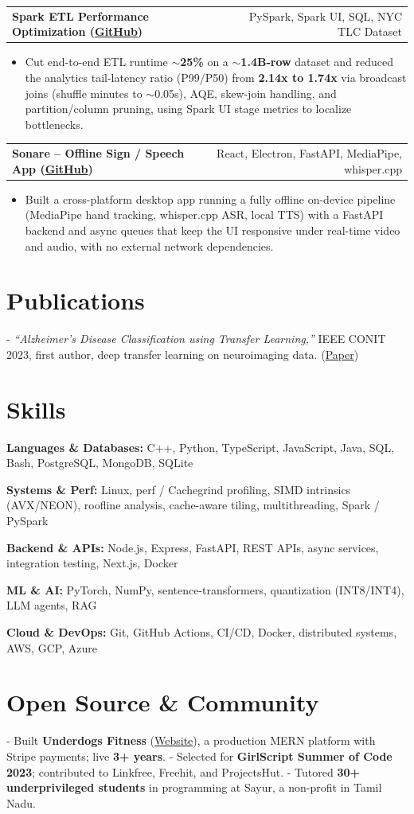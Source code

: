 \documentclass[letterpaper,11pt]{article}
\makeatletter
\newcommand{\projItem}[2]{%
  \vspace{2pt}
  \begin{tabular*}{\textwidth}{@{}l@{\extracolsep{\fill}}r@{}}
    \textbf{#1} & #2 \\
  \end{tabular*}\par\vspace{-3pt}
}
\newcommand{\skillLine}[2]{\textbf{#1:} #2\par\vspace{1.5pt}}
\newcommand{\inlineBlock}[1]{{\setlength{\leftskip}{0.18in}\small #1\par}}
\makeatother
\begin{document}
\projItem{Spark ETL Performance Optimization {\normalfont\small(\href{https://github.com/Deva-1903/Spark-ETL-Optimization}{GitHub})}}{PySpark, Spark UI, SQL, NYC TLC Dataset}
\begin{itemize}
  \item Cut end-to-end ETL runtime \textbf{$\sim$25\%} on a \textbf{$\sim$1.4B-row} dataset and reduced the analytics tail-latency ratio (P99/P50) from \textbf{2.14x to 1.74x} via broadcast joins (shuffle minutes to $\sim$0.05s), AQE, skew-join handling, and partition/column pruning, using Spark UI stage metrics to localize bottlenecks.
\end{itemize}

\projItem{Sonare -- Offline Sign / Speech App {\normalfont\small(\href{https://github.com/Deva-1903/Qualcomm-Sep25-Team-Sonare}{GitHub})}}{React, Electron, FastAPI, MediaPipe, whisper.cpp}
\begin{itemize}
  \item Built a cross-platform desktop app running a fully offline on-device pipeline (MediaPipe hand tracking, whisper.cpp ASR, local TTS) with a FastAPI backend and async queues that keep the UI responsive under real-time video and audio, with no external network dependencies.
\end{itemize}

\section{Publications}
\vspace{2pt}
\inlineBlock{- \textit{``Alzheimer's Disease Classification using Transfer Learning,''} IEEE CONIT 2023, first author, deep transfer learning on neuroimaging data. {\normalfont\small(\href{https://ieeexplore.ieee.org/document/10205760}{Paper})}}

\section{Skills}
\skillLine{Languages \& Databases}{C++, Python, TypeScript, JavaScript, Java, SQL, Bash, PostgreSQL, MongoDB, SQLite}
\skillLine{Systems \& Perf}{Linux, perf / Cachegrind profiling, SIMD intrinsics (AVX/NEON), roofline analysis, cache-aware tiling, multithreading, Spark / PySpark}
\skillLine{Backend \& APIs}{Node.js, Express, FastAPI, REST APIs, async services, integration testing, Next.js, Docker}
\skillLine{ML \& AI}{PyTorch, NumPy, sentence-transformers, quantization (INT8/INT4), LLM agents, RAG}
\skillLine{Cloud \& DevOps}{Git, GitHub Actions, CI/CD, Docker, distributed systems, AWS, GCP, Azure}

\section{Open Source \& Community}
\inlineBlock{- Built \textbf{Underdogs Fitness} (\href{https://www.underdogsfitness.in/}{Website}), a production MERN platform with Stripe payments; live \textbf{3+ years}. - Selected for \textbf{GirlScript Summer of Code 2023}; contributed to Linkfree, Freehit, and ProjectsHut. - Tutored \textbf{30+ underprivileged students} in programming at Sayur, a non-profit in Tamil Nadu.}
\end{document}
